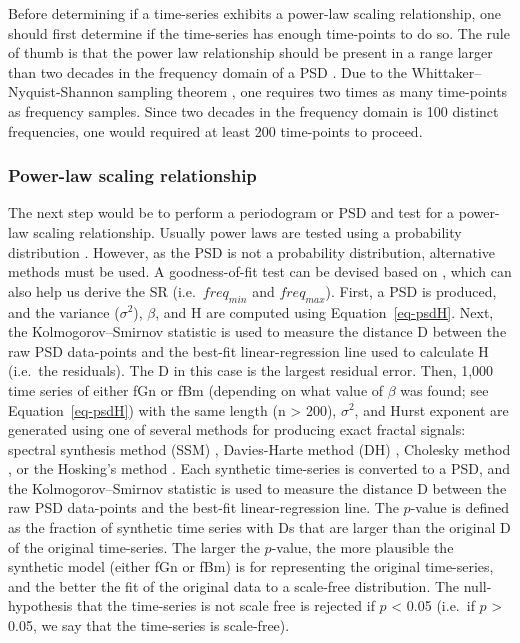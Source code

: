 \documentclass[
  sn-vancouver,
  Numbered,
  referee,
  lineno]{sn-jnl}
\begin{document}
Before determining if a time-series exhibits a power-law scaling
relationship, one should first determine if the time-series has enough
time-points to do so. The rule of thumb is that the power law
relationship should be present in a range larger than two decades in the
frequency domain of a PSD \citep{ekePhysiologicalTimeSeries2000}. Due to
the Whittaker--Nyquist-Shannon sampling theorem
\citep{shannonCommunicationPresenceNoise1949}, one requires two times as
many time-points as frequency samples. Since two decades in the
frequency domain is 100 distinct frequencies, one would required at
least 200 time-points to proceed.

\subsubsection{Power-law scaling
relationship}\label{power-law-scaling-relationship-2}

The next step would be to perform a periodogram or PSD and test for a
power-law scaling relationship. Usually power laws are tested using a
probability distribution
\citep{clausetPowerLawDistributionsEmpirical2009}. However, as the PSD
is not a probability distribution, alternative methods must be used. A
goodness-of-fit test can be devised based on
\citet{clausetPowerLawDistributionsEmpirical2009}, which can also help
us derive the SR (i.e.~\(freq_{min}\) and \(freq_{max}\)). First, a PSD
is produced, and the variance (\(\sigma^2\)), \(\beta\), and H are
computed using Equation~\ref{eq-psdH}. Next, the Kolmogorov--Smirnov
statistic
\citep{kolmogorovSullaDeterminazioneEmpirica1933, smirnovTableEstimatingGoodness1948}
is used to measure the distance D between the raw PSD data-points and
the best-fit linear-regression line used to calculate H (i.e.~the
residuals). The D in this case is the largest residual error. Then,
1,000 time series of either fGn or fBm (depending on what value of
\(\beta\) was found; see Equation~\ref{eq-psdH}) with the same length (n
\textgreater{} 200), \(\sigma^2\), and Hurst exponent are generated
using one of several methods for producing exact fractal signals:
spectral synthesis method (SSM) \citep{peitgenScienceFractalImages1988},
Davies-Harte method (DH) \citep{daviesTestsHurstEffect1987}, Cholesky
method \citep{asmussenStochasticSimulationView1998}, or the Hosking's
method \citep{hoskingModelingPersistenceHydrological1984}. Each
synthetic time-series is converted to a PSD, and the Kolmogorov--Smirnov
statistic is used to measure the distance D between the raw PSD
data-points and the best-fit linear-regression line. The \(p\)-value is
defined as the fraction of synthetic time series with Ds that are larger
than the original D of the original time-series. The larger the
\(p\)-value, the more plausible the synthetic model (either fGn or fBm)
is for representing the original time-series, and the better the fit of
the original data to a scale-free distribution. The null-hypothesis that
the time-series is not scale free is rejected if \(p\) \textless{} 0.05
(i.e.~if \(p\) \textgreater{} 0.05, we say that the time-series is
scale-free).
\end{document}
